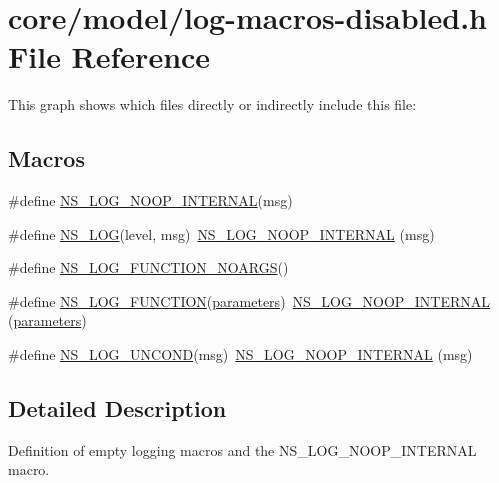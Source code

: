 \hypertarget{log-macros-disabled_8h}{}\section{core/model/log-\/macros-\/disabled.h File Reference}
\label{log-macros-disabled_8h}
This graph shows which files directly or indirectly include this file\+:
\subsection*{Macros}
\begin{DoxyCompactItemize}
\item 
\#define \hyperlink{group__logging_ga426ea8a6e4e51015f546cccb5eeebfa1}{N\+S\+\_\+\+L\+O\+G\+\_\+\+N\+O\+O\+P\+\_\+\+I\+N\+T\+E\+R\+N\+AL}(msg)
\item 
\#define \hyperlink{log-macros-disabled_8h_ab01b4392d98b06fb128e77c85129a477}{N\+S\+\_\+\+L\+OG}(level,  msg)~\hyperlink{group__logging_ga426ea8a6e4e51015f546cccb5eeebfa1}{N\+S\+\_\+\+L\+O\+G\+\_\+\+N\+O\+O\+P\+\_\+\+I\+N\+T\+E\+R\+N\+AL} (msg)
\item 
\#define \hyperlink{log-macros-disabled_8h_a8f7e4afc291c9d29a65c18ac1f79197b}{N\+S\+\_\+\+L\+O\+G\+\_\+\+F\+U\+N\+C\+T\+I\+O\+N\+\_\+\+N\+O\+A\+R\+GS}()
\item 
\#define \hyperlink{log-macros-disabled_8h_a90b90d5bad1f39cb1b64923ea94c0761}{N\+S\+\_\+\+L\+O\+G\+\_\+\+F\+U\+N\+C\+T\+I\+ON}(\hyperlink{design_8txt_a61257d1df1c87e8bd4ba94cacb4982cf}{parameters})~\hyperlink{group__logging_ga426ea8a6e4e51015f546cccb5eeebfa1}{N\+S\+\_\+\+L\+O\+G\+\_\+\+N\+O\+O\+P\+\_\+\+I\+N\+T\+E\+R\+N\+AL} (\hyperlink{design_8txt_a61257d1df1c87e8bd4ba94cacb4982cf}{parameters})
\item 
\#define \hyperlink{log-macros-disabled_8h_a0b36e5e182b37194f85ef1c5e979fb2e}{N\+S\+\_\+\+L\+O\+G\+\_\+\+U\+N\+C\+O\+ND}(msg)~\hyperlink{group__logging_ga426ea8a6e4e51015f546cccb5eeebfa1}{N\+S\+\_\+\+L\+O\+G\+\_\+\+N\+O\+O\+P\+\_\+\+I\+N\+T\+E\+R\+N\+AL} (msg)
\end{DoxyCompactItemize}


\subsection{Detailed Description}
Definition of empty logging macros and the N\+S\+\_\+\+L\+O\+G\+\_\+\+N\+O\+O\+P\+\_\+\+I\+N\+T\+E\+R\+N\+AL macro. 

